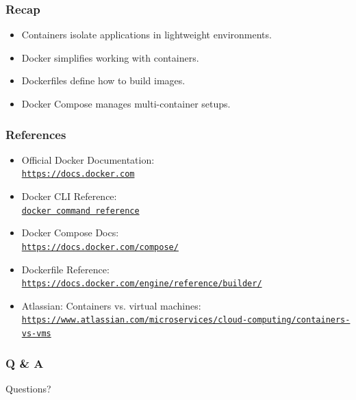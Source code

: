 \documentclass{beamer}
\begin{document}
\begin{frame}
\frametitle{Recap}
\begin{itemize}
    \item Containers isolate applications in lightweight environments.
    \item Docker simplifies working with containers.
    \item Dockerfiles define how to build images.
    \item Docker Compose manages multi-container setups.
\end{itemize}
\end{frame}

\begin{frame}
\frametitle{References}

\begin{itemize}
  \item Official Docker Documentation: \\
  \href{https://docs.docker.com}{\texttt{https://docs.docker.com}}

  \item Docker CLI Reference: \\
  \href{https://docs.docker.com/engine/reference/commandline/docker}{\texttt{docker command reference}}

  \item Docker Compose Docs: \\
  \href{https://docs.docker.com/compose/}{\texttt{https://docs.docker.com/compose/}}

  \item Dockerfile Reference: \\
  \href{https://docs.docker.com/engine/reference/builder/}{\texttt{https://docs.docker.com/engine/reference/builder/}}

  \item Atlassian: Containers vs. virtual machines: \\
  \href{https://www.atlassian.com/microservices/cloud-computing/containers-vs-vms}{ \scriptsize \texttt{https://www.atlassian.com/microservices/cloud-computing/containers-vs-vms}}
\end{itemize}

\end{frame}

\begin{frame}
\frametitle{Q \& A}
\centering
{\Huge Questions?}
\end{frame}
\end{document}
